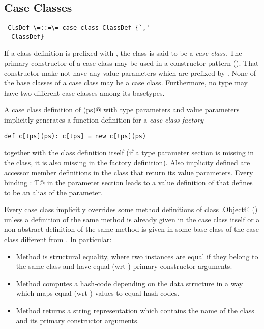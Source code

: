 \documentclass[11pt]{report}
\begin{document}
\subsection{Case Classes}
\label{sec:case-classes}

\syntax\begin{verbatim} ClsDef \=::=\= case class ClassDef {`,'
  ClassDef}
\end{verbatim}

If a class definition is prefixed with \verb@case@, the class is said
to be a {\em case class}.  The primary constructor of a case class may
be used in a constructor pattern ().  That
constructor make not have any value parameters which are prefixed by
\verb@def@.  None of the base classes of a case class may be a case
class. Furthermore, no type may have two different case classes among
its basetypes.

A case class definition of \verb@c[tps](ps)@ with type
parameters \verb@tps@ and value parameters \verb@ps@ implicitly
generates a function definition for a {\em case class factory}
\begin{verbatim}
def c[tps](ps): c[tps] = new c[tps](ps)
\end{verbatim}
together with the class definition itself (if a type parameter section
is missing in the class, it is also missing in the factory
definition).  Also implicity defined are accessor member definitions
in the class that return its value parameters. Every binding
\verb@x: T@ in the parameter section leads to a value definition of
\verb@x@ that defines \verb@x@ to be an alias of the parameter.  

Every case class implicitly overrides some method definitions of class
\verb@scala.Object@ () unless a definition of the same
method is already given in the case class itself or a non-abstract
definition of the same method is given in some base class of the case
class different from \verb@Object@. In particular:
\begin{itemize}
\item[] Method \verb@equals@ is structural equality, where two
instances are equal if they belong to the same class and
have equal (wrt \verb@equals@) primary constructor arguments.
\item[] Method \verb@hashCode@ computes a hash-code
depending on the data structure in a way which maps equal (wrt
\verb@equals@) values to equal hash-codes.
\item[] Method \verb@toString@ returns a string representation which
contains the name of the class and its primary constructor arguments.
\end{itemize}
\end{document}
